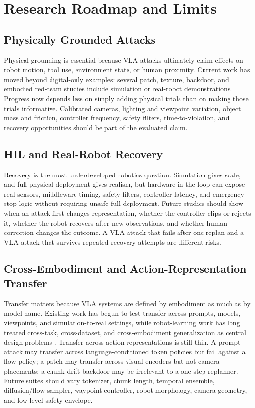 \section{Research Roadmap and Limits}
\label{sec:open-problems}

\subsection{Physically Grounded Attacks}

Physical grounding is essential because VLA attacks ultimately claim effects on robot motion, tool use, environment state, or human proximity. Current work has moved beyond digital-only examples: several patch, texture, backdoor, and embodied red-team studies include simulation or real-robot demonstrations. Progress now depends less on simply adding physical trials than on making those trials informative. Calibrated cameras, lighting and viewpoint variation, object mass and friction, controller frequency, safety filters, time-to-violation, and recovery opportunities should be part of the evaluated claim.

\subsection{HIL and Real-Robot Recovery}

Recovery is the most underdeveloped robotics question. Simulation gives scale, and full physical deployment gives realism, but hardware-in-the-loop can expose real sensors, middleware timing, safety filters, controller latency, and emergency-stop logic without requiring unsafe full deployment. Future studies should show when an attack first changes representation, whether the controller clips or rejects it, whether the robot recovers after new observations, and whether human correction changes the outcome. A VLA attack that fails after one replan and a VLA attack that survives repeated recovery attempts are different risks.

\subsection{Cross-Embodiment and Action-Representation Transfer}

Transfer matters because VLA systems are defined by embodiment as much as by model name. Existing work has begun to test transfer across prompts, models, viewpoints, and simulation-to-real settings, while robot-learning work has long treated cross-task, cross-dataset, and cross-embodiment generalization as central design problems \cite{jang2021bcz,kalashnikov2021mtopt,lynch2022interactive,openx2023,khazatsky2024droid} \cite{mandlekar2021robomimic,mandlekar2023mimicgen,ghosh2024octo,bousmalis2023robocat,nvidia2025gr00tn1}. Transfer across action representations is still thin. A prompt attack may transfer across language-conditioned token policies but fail against a flow policy; a patch may transfer across visual encoders but not camera placements; a chunk-drift backdoor may be irrelevant to a one-step replanner. Future suites should vary tokenizer, chunk length, temporal ensemble, diffusion/flow sampler, waypoint controller, robot morphology, camera geometry, and low-level safety envelope.

